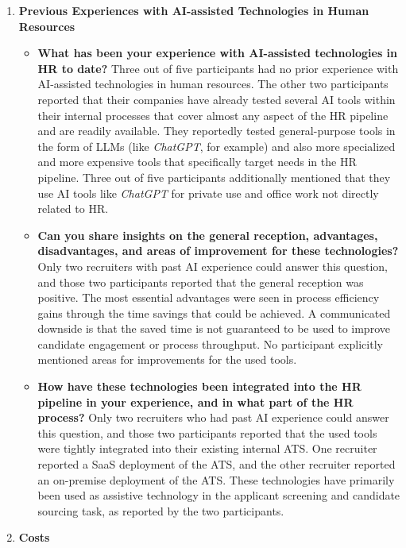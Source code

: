 \documentclass[draft,final]{thesisclass} %
\begin{document}
\begin{enumerate}
\begin{itemize}
    \end{itemize}
    \item \textbf{Previous Experiences with \acs{AI}-assisted Technologies in Human Resources}
    \begin{itemize}
        \item \textbf{What has been your experience with \acs{AI}-assisted technologies in \acs{HR} to date?}
        Three out of five participants had no prior experience with \acs{AI}-assisted technologies in human resources. The other two participants reported that their companies have already tested several \acs{AI} tools within their internal processes that cover almost any aspect of the \acs{HR} pipeline and are readily available. They reportedly tested general-purpose tools in the form of \gls{LLM}s (like \textit{ChatGPT}, for example) and also more specialized and more expensive tools that specifically target needs in the \acs{HR} pipeline. Three out of five participants additionally mentioned that they use \acs{AI} tools like \textit{ChatGPT} for private use and office work not directly related to \acs{HR}.
        \item \textbf{Can you share insights on the general reception, advantages, disadvantages, and areas of improvement for these technologies?}
        Only two recruiters with past \acs{AI} experience could answer this question, and those two participants reported that the general reception was positive. The most essential advantages were seen in process efficiency gains through the time savings that could be achieved. A communicated downside is that the saved time is not guaranteed to be used to improve candidate engagement or process throughput. No participant explicitly mentioned areas for improvements for the used tools.
        \item \textbf{How have these technologies been integrated into the \acs{HR} pipeline in your experience, and in what part of the \acs{HR} process?}
        Only two recruiters who had past \acs{AI} experience could answer this question, and those two participants reported that the used tools were tightly integrated into their existing internal \acs{ATS}. One recruiter reported a \acs{SaaS} deployment of the \acs{ATS}, and the other recruiter reported an on-premise deployment of the \acs{ATS}. These technologies have primarily been used as assistive technology in the applicant screening and candidate sourcing task, as reported by the two participants.
    \end{itemize}
    \item \textbf{Costs}

\end{enumerate}
\end{document}
